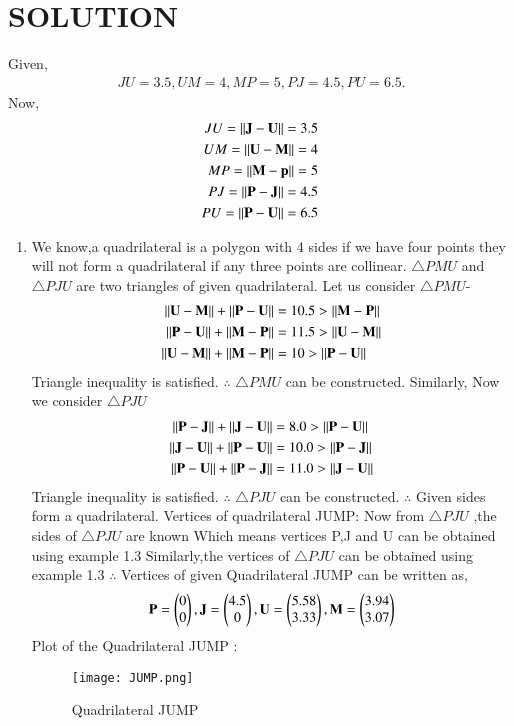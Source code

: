 \documentclass[journal,12pt,twocolumn]{IEEEtran}
\begin{document}
\section{SOLUTION}
 Given,
\begin{align}
\ JU=3.5, UM=4, MP=5, PJ=4.5, PU=6.5 .
\end{align}
Now,
\begin{align}
JU=\left\lVert\mathbf{J}-\mathbf{U}\right\rVert = 3.5
 \\
UM=\left\lVert\mathbf{U}-\mathbf{M}\right\rVert = 4
 \\
MP=\left\lVert\mathbf{M}-\mathbf{p}\right\rVert = 5
 \\
PJ=\left\lVert\mathbf{P}-\mathbf{J}\right\rVert = 4.5
 \\
PU=\left\lVert\mathbf{P}-\mathbf{U}\right\rVert = 6.5
\end{align}
\begin{enumerate}
\item We know,a quadrilateral is a polygon with 4 sides if we have four points they will not form a quadrilateral if any three points are collinear. 
$\triangle PMU$ and $\triangle PJU$ are two triangles of given quadrilateral.
Let us consider $\triangle PMU$-
\begin{align}
\left\lVert\mathbf{U}-\mathbf{M}\right\rVert+\left\lVert\mathbf{P}-\mathbf{U}\right\rVert&=10.5> \left\lVert\mathbf{M}-\mathbf{P}\right\rVert\\
\left\lVert\mathbf{P}-\mathbf{U}\right\rVert+\left\lVert\mathbf{M}-\mathbf{P}\right\rVert&=11.5>\left\lVert\mathbf{U}-\mathbf{M}\right\rVert\\
\left\lVert\mathbf{U}-\mathbf{M}\right\rVert+\left\lVert\mathbf{M}-\mathbf{P}\right\rVert&=10>\left\lVert\mathbf{P}-\mathbf{U}\right\rVert
\end{align}
Triangle inequality is satisfied.
$\therefore$ $\triangle PMU$ can be constructed.
Similarly, Now we consider $\triangle PJU$
\begin{align}
\left\lVert\mathbf{P}-\mathbf{J}\right\rVert + \left\lVert\mathbf{J}-\mathbf{U}\right\rVert&=8.0 > \left\lVert\mathbf{P}-\mathbf{U}\right\rVert
\\
\left\lVert\mathbf{J}-\mathbf{U}\right\rVert + \left\lVert\mathbf{P}-\mathbf{U}\right\rVert&=10.0 > \left\lVert\mathbf{P}-\mathbf{J}\right\rVert
\\
\left\lVert\mathbf{P}-\mathbf{U}\right\rVert + \left\lVert\mathbf{P}-\mathbf{J}\right\rVert&=11.0 > \left\lVert\mathbf{J}-\mathbf{U}\right\rVert
\end{align}
Triangle inequality is satisfied.
$\therefore$ $\triangle PJU$ can be constructed.
$\therefore$ Given sides form a quadrilateral.
Vertices of quadrilateral JUMP:
Now from $\triangle PJU$ ,the sides of $\triangle PJU$ are known Which means vertices P,J and U can be obtained using example 1.3
Similarly,the vertices of $\triangle PJU$ can be obtained using example 1.3
$\therefore$ Vertices of given Quadrilateral JUMP can be written as,
\begin{align}
\mathbf{P}=\begin{pmatrix}0\\0\end{pmatrix},\mathbf{J} = \begin{pmatrix}4.5\\0\end{pmatrix}, \mathbf{U}=\begin{pmatrix}5.58\\3.33\end{pmatrix},\mathbf{M}=\begin{pmatrix}3.94\\3.07\end{pmatrix}
\end{align}
Plot of the Quadrilateral JUMP :
\begin{figure}[!ht]
    \centering
    \texttt{[image: JUMP.png]}
    \caption{Quadrilateral JUMP}
    \label{fig:Quadrilateral JUMP}
\end{figure}
\end{enumerate}
\end{document}
